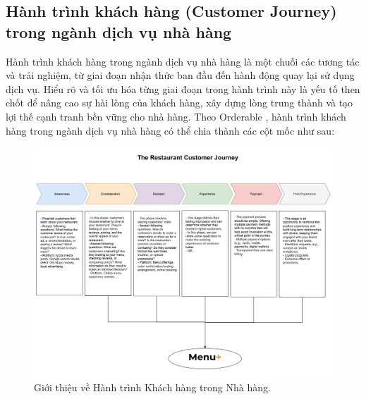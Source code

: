 \subsection{Hành trình khách hàng (Customer Journey) trong ngành dịch vụ nhà hàng}

Hành trình khách hàng trong ngành dịch vụ nhà hàng là một chuỗi các tương tác và trải nghiệm, từ giai đoạn nhận thức ban đầu đến hành động quay lại sử dụng dịch vụ. Hiểu rõ và tối ưu hóa từng giai đoạn trong hành trình này là yếu tố then chốt để nâng cao sự hài lòng của khách hàng, xây dựng lòng trung thành và tạo lợi thế cạnh tranh bền vững cho nhà hàng. Theo Orderable \cite{Orderable}, hành trình khách hàng trong ngành dịch vụ nhà hàng có thể chia thành các cột mốc như sau:

\begin{figure}[H]
	\centering
	\includegraphics[width=15cm]{Images/restaurant-customer-journey.png}
	\caption{Giới thiệu về Hành trình Khách hàng trong Nhà hàng.}
	\label{fig:my_label}
\end{figure}

